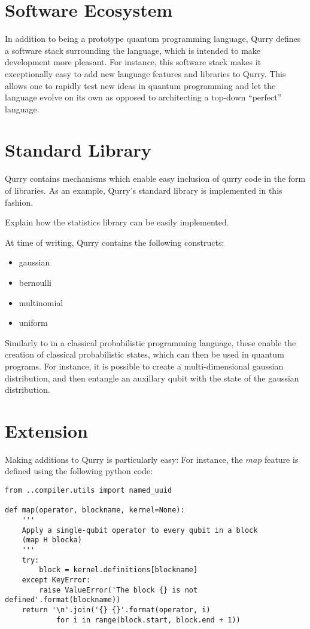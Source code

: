 \documentclass[a4paper,twocolumn,11pt,accepted=2017-05-09]{quantumarticle}
\begin{document}
\section{Software Ecosystem}

In addition to being a prototype quantum programming language, Qurry defines a software stack surrounding the language, which is intended to make development more pleasant.
For instance, this software stack makes it exceptionally easy to add new language features and libraries to Qurry.
This allows one to rapidly test new ideas in quantum programming and let the language evolve on its own as opposed to architecting a top-down ``perfect'' language.

\section{Standard Library}

    Qurry contains mechanisms which enable easy inclusion of qurry code in the form of libraries.
    As an example, Qurry's standard library is implemented in this fashion.

    Explain how the statistics library can be easily implemented.

    At time of writing, Qurry contains the following constructs:  	
    \begin{itemize}
	    \item gaussian 	
        \item bernoulli
	    \item multinomial 	
	    \item uniform
    \end{itemize}

    Similarly to in a classical probabilistic programming language, these enable the creation of classical probabilistic states, which can then be used in quantum programs.
    For instance, it is possible to create a multi-dimensional gaussian distribution, and then entangle an auxillary qubit with the state of the gaussian distribution.

    \section{Extension}

    Making additions to Qurry is particularly easy:
    For instance, the $map$ feature is defined using the following python code:

    \begin{verbatim}
from ..compiler.utils import named_uuid

def map(operator, blockname, kernel=None):
    '''
    Apply a single-qubit operator to every qubit in a block
    (map H blocka)
    '''
    try:
        block = kernel.definitions[blockname]
    except KeyError:
        raise ValueError('The block {} is not defined'.format(blockname))
    return '\n'.join('{} {}'.format(operator, i)
            for i in range(block.start, block.end + 1))
    \end{verbatim}
\end{document}
